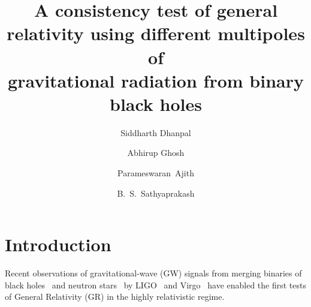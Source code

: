 \documentclass[prd,preprintnumbers,twocolumn,eqsecnum,floatfix,a4paper,nofootinbib,superscriptaddress]{revtex4}
\begin{document}
\newcommand{\be}{\begin{equation}}
\newcommand{\ee}{\end{equation}}
\newcommand{\ber}{\begin{eqnarray}}
\newcommand{\eer}{\end{eqnarray}}
\def\bea{\begin{eqnarray}}
\def\eea{\end{eqnarray}}
\newcommand{\etal}{\emph{et al}}

\title{A consistency test of general relativity using different multipoles of \\gravitational radiation from binary black holes}
\author{Siddharth Dhanpal}
\author{Abhirup Ghosh}
\author{Parameswaran~Ajith}
\author{B.~S.~Sathyaprakash}

\begin{abstract}
\end{abstract}
\maketitle
\section{Introduction}

Recent observations of gravitational-wave (GW) signals from merging binaries of black holes~\cite{bbh_refs} and neutron stars~\cite{bns_ref} by LIGO~\cite{ligo_ref} and Virgo~\cite{virgo_ref} have enabled the first tests of General Relativity (GR) in the highly relativistic regime. 
\end{document}
